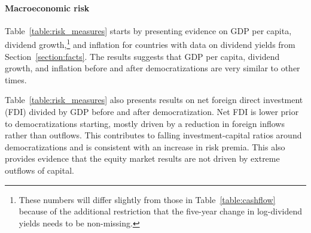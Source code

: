 \documentclass[12pt]{article}
\numberwithin{equation}{section}
\begin{document}
\paragraph{Macroeconomic risk} 
Table~\ref{table:risk_measures} starts by presenting evidence on GDP per capita, dividend growth,\footnote{These numbers will differ slightly from those in Table~\ref{table:cashflow} because of the additional restriction that the five-year change in log-dividend yields needs to be non-missing.} and inflation for countries with data on dividend yields from Section~\ref{section:facts}.  The results suggests that GDP per capita, dividend growth, and inflation before and after democratizations are very similar to other times.

    
Table~\ref{table:risk_measures} also presents results on net foreign direct investment (FDI) divided by GDP before and after democratization. Net FDI is lower prior to democratizations starting, mostly driven by a reduction in foreign inflows rather than outflows. This contributes to falling investment-capital ratios around democratizations and is consistent with an increase in risk premia.  This also provides evidence that the equity market results are not driven by extreme outflows of capital.
\end{document}

